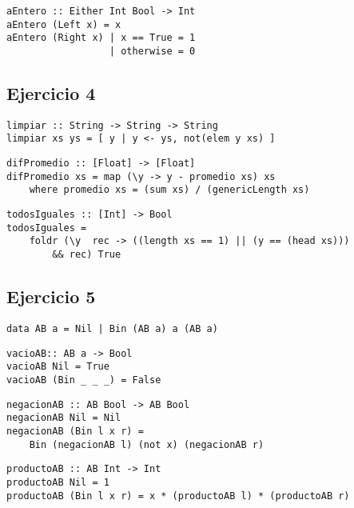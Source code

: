 \begin{centrado}
\begin{verbatim}
aEntero :: Either Int Bool -> Int
aEntero (Left x) = x
aEntero (Right x) | x == True = 1
                  | otherwise = 0
\end{verbatim}
\end{centrado}

\subsection{Ejercicio 4}
\begin{centrado}
\begin{verbatim}
limpiar :: String -> String -> String
limpiar xs ys = [ y | y <- ys, not(elem y xs) ]
\end{verbatim}
\end{centrado}
\begin{centrado}
	\begin{verbatim}
difPromedio :: [Float] -> [Float]
difPromedio xs = map (\y -> y - promedio xs) xs 
    where promedio xs = (sum xs) / (genericLength xs)
\end{verbatim}
\end{centrado}
\begin{centrado}
	\begin{verbatim}
todosIguales :: [Int] -> Bool
todosIguales = 
	foldr (\y  rec -> ((length xs == 1) || (y == (head xs))) 
		&& rec) True
\end{verbatim}
\end{centrado}

\subsection{Ejercicio 5}
\begin{centrado}
\begin{verbatim}
data AB a = Nil | Bin (AB a) a (AB a)
\end{verbatim}
\end{centrado}
\begin{centrado}
	\begin{verbatim}
vacioAB:: AB a -> Bool
vacioAB Nil = True
vacioAB (Bin _ _ _) = False
\end{verbatim}
\end{centrado}
\begin{centrado}
	\begin{verbatim}
negacionAB :: AB Bool -> AB Bool
negacionAB Nil = Nil
negacionAB (Bin l x r) = 
	Bin (negacionAB l) (not x) (negacionAB r)
\end{verbatim}
\end{centrado}
\begin{centrado}
	\begin{verbatim}
productoAB :: AB Int -> Int
productoAB Nil = 1
productoAB (Bin l x r) = x * (productoAB l) * (productoAB r)
\end{verbatim}
\end{centrado}